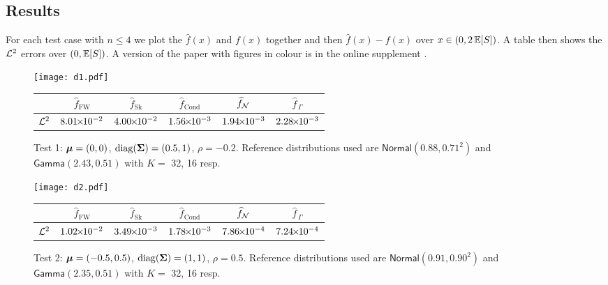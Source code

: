 

\subsection{Results}

For each test case with $n \le 4$ we plot the $\widehat{f}(x)$ and $f(x)$ together and then $\widehat{f}(x)-f(x)$ over $x \in (0, 2\operatorname{{\mathbb E}}[S])$. A table then shows the $\mathcal{L}^2$ errors over $(0, \operatorname{{\mathbb E}}[S])$. A version of the paper
with figures in colour is in the online supplement \cite{OrthogoCode}.
\setlength\extrarowheight{3pt}

\begin{figure}[H]
\centering
\texttt{[image: d1.pdf]}

\vspace{4mm}

\begin{tabular}{c|c|c|c|c|c|}
\cline{2-6}
                         & $\widehat{f}_{\mathrm{FW}}$  & $\widehat{f}_{\mathrm{Sk}}$ & $\widehat{f}_{\mathrm{Cond}}$ & $\widehat{f}_{\mathcal{N}}$  & $\widehat{f}_{\,\Gamma}$ \\ \hline
\multicolumn{1}{|c|}{$\mathcal{L}^2$} & $8.01 {\mkern-2mu\times\mkern-2mu} 10^{-2}$ & $4.00 {\mkern-2mu\times\mkern-2mu} 10^{-2}$ & $1.56 {\mkern-2mu\times\mkern-2mu} 10^{-3}$ & $1.94 {\mkern-2mu\times\mkern-2mu} 10^{-3}$ & $2.28 {\mkern-2mu\times\mkern-2mu} 10^{-3}$ \\  \hline
\end{tabular}
\caption*{Test 1: $\bm{\mu} = (0, 0)$, $\mathrm{diag}(\bm{\Sigma}) = (0.5, 1)$, $\rho = -0.2$. Reference distributions used are $\mathsf{Normal}(0.88,0.71^2)$ and $\mathsf{Gamma}(2.43,0.51)$ with $K =$ 32, 16 resp.}
\end{figure}




\begin{figure}[H]
\centering
\texttt{[image: d2.pdf]}

\vspace{4mm}

\begin{tabular}{c|c|c|c|c|c|}
\cline{2-6}
                         & $\widehat{f}_{\mathrm{FW}}$  & $\widehat{f}_{\mathrm{Sk}}$ & $\widehat{f}_{\mathrm{Cond}}$ & $\widehat{f}_{\mathcal{N}}$  & $\widehat{f}_{\,\Gamma}$ \\ \hline
\multicolumn{1}{|c|}{$\mathcal{L}^2$} & $1.02 {\mkern-2mu\times\mkern-2mu} 10^{-2}$ & $3.49 {\mkern-2mu\times\mkern-2mu} 10^{-3}$ & $1.78 {\mkern-2mu\times\mkern-2mu} 10^{-3}$ & $7.86 {\mkern-2mu\times\mkern-2mu} 10^{-4}$ & $7.24 {\mkern-2mu\times\mkern-2mu} 10^{-4}$ \\ \hline
\end{tabular}
\caption*{Test 2: $\bm{\mu} = (-0.5, 0.5)$, $\mathrm{diag}(\bm{\Sigma})= (1,1)$, $\rho = 0.5$. Reference distributions used are $\mathsf{Normal}(0.91,0.90^2)$ and $\mathsf{Gamma}(2.35,0.51)$ with $K =$ 32, 16 resp.}
\end{figure}

